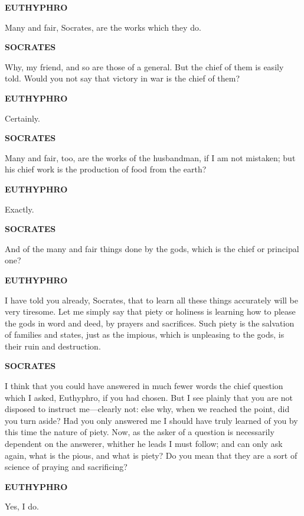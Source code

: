 \documentclass[11pt,letter]{article}
\begin{document}
\par \textbf{EUTHYPHRO}
\par   Many and fair, Socrates, are the works which they do.

\par \textbf{SOCRATES}
\par   Why, my friend, and so are those of a general. But the chief of them is easily told. Would you not say that victory in war is the chief of them?

\par \textbf{EUTHYPHRO}
\par   Certainly.

\par \textbf{SOCRATES}
\par   Many and fair, too, are the works of the husbandman, if I am not mistaken; but his chief work is the production of food from the earth?

\par \textbf{EUTHYPHRO}
\par   Exactly.

\par \textbf{SOCRATES}
\par   And of the many and fair things done by the gods, which is the chief or principal one?

\par \textbf{EUTHYPHRO}
\par   I have told you already, Socrates, that to learn all these things accurately will be very tiresome. Let me simply say that piety or holiness is learning how to please the gods in word and deed, by prayers and sacrifices. Such piety is the salvation of families and states, just as the impious, which is unpleasing to the gods, is their ruin and destruction.

\par \textbf{SOCRATES}
\par   I think that you could have answered in much fewer words the chief question which I asked, Euthyphro, if you had chosen. But I see plainly that you are not disposed to instruct me—clearly not:  else why, when we reached the point, did you turn aside? Had you only answered me I should have truly learned of you by this time the nature of piety. Now, as the asker of a question is necessarily dependent on the answerer, whither he leads I must follow; and can only ask again, what is the pious, and what is piety? Do you mean that they are a sort of science of praying and sacrificing?

\par \textbf{EUTHYPHRO}
\par   Yes, I do.
\end{document}
